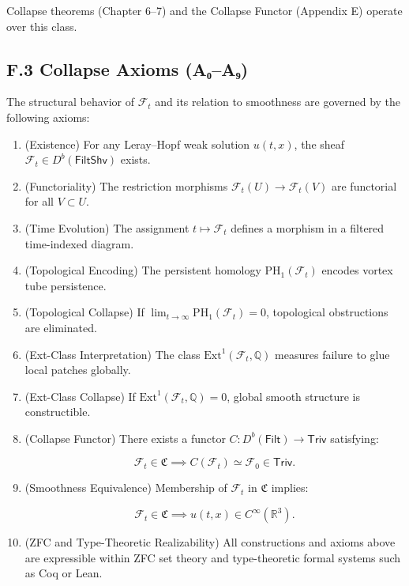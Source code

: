 \documentclass[11pt]{article}
\begin{document}
Collapse theorems (Chapter 6–7) and the Collapse Functor (Appendix E) operate over this class.

\subsection*{F.3 Collapse Axioms (A₀–A₉)}

The structural behavior of \( \mathcal{F}_t \) and its relation to smoothness are governed by the following axioms:

\begin{enumerate}
  \item[\textbf{A₀.}] (Existence)  
  For any Leray–Hopf weak solution \( u(t, x) \), the sheaf \( \mathcal{F}_t \in D^b(\mathsf{FiltShv}) \) exists.

  \item[\textbf{A₁.}] (Functoriality)  
  The restriction morphisms \( \mathcal{F}_t(U) \to \mathcal{F}_t(V) \) are functorial for all \( V \subset U \).

  \item[\textbf{A₂.}] (Time Evolution)  
  The assignment \( t \mapsto \mathcal{F}_t \) defines a morphism in a filtered time-indexed diagram.

  \item[\textbf{A₃.}] (Topological Encoding)  
  The persistent homology \( \mathrm{PH}_1(\mathcal{F}_t) \) encodes vortex tube persistence.

  \item[\textbf{A₄.}] (Topological Collapse)  
  If \( \lim_{t \to \infty} \mathrm{PH}_1(\mathcal{F}_t) = 0 \), topological obstructions are eliminated.

  \item[\textbf{A₅.}] (Ext-Class Interpretation)  
  The class \( \mathrm{Ext}^1(\mathcal{F}_t, \mathbb{Q}) \) measures failure to glue local patches globally.

  \item[\textbf{A₆.}] (Ext-Class Collapse)  
  If \( \mathrm{Ext}^1(\mathcal{F}_t, \mathbb{Q}) = 0 \), global smooth structure is constructible.

  \item[\textbf{A₇.}] (Collapse Functor)  
  There exists a functor \( C : D^b(\mathsf{Filt}) \to \mathsf{Triv} \) satisfying:

  \[
  \mathcal{F}_t \in \mathfrak{C} \implies C(\mathcal{F}_t) \simeq \mathcal{F}_0 \in \mathsf{Triv}.
  \]

  \item[\textbf{A₈.}] (Smoothness Equivalence)  
  Membership of \( \mathcal{F}_t \) in \( \mathfrak{C} \) implies:

  \[
  \mathcal{F}_t \in \mathfrak{C} \implies u(t, x) \in C^\infty(\mathbb{R}^3).
  \]

  \item[\textbf{A₉.}] (ZFC and Type-Theoretic Realizability)  
  All constructions and axioms above are expressible within ZFC set theory and type-theoretic formal systems such as Coq or Lean.
\end{enumerate}
\end{document}
